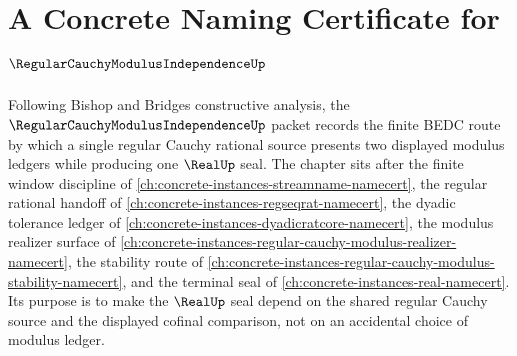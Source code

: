 \chapter{A Concrete Naming Certificate for $\RegularCauchyModulusIndependenceUp$}
\label{ch:concrete-instances-regular-cauchy-modulus-independence-namecert}

Following Bishop and Bridges constructive analysis, the $\RegularCauchyModulusIndependenceUp$ packet records the finite BEDC route by which a single regular Cauchy rational source presents two displayed modulus ledgers while producing one $\RealUp$ seal. The chapter sits after the finite window discipline of \autoref{ch:concrete-instances-streamname-namecert}, the regular rational handoff of \autoref{ch:concrete-instances-regseqrat-namecert}, the dyadic tolerance ledger of \autoref{ch:concrete-instances-dyadicratcore-namecert}, the modulus realizer surface of \autoref{ch:concrete-instances-regular-cauchy-modulus-realizer-namecert}, the stability route of \autoref{ch:concrete-instances-regular-cauchy-modulus-stability-namecert}, and the terminal seal of \autoref{ch:concrete-instances-real-namecert}. Its purpose is to make the $\RealUp$ seal depend on the shared regular Cauchy source and the displayed cofinal comparison, not on an accidental choice of modulus ledger.

